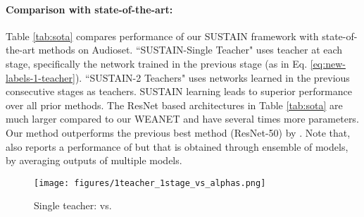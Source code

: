 \documentclass{article}
\begin{document}
\paragraph{Comparison with state-of-the-art:}
\begin{table}[t!]
  \centering
    \caption{Comparison with state-of-the-art methods on Audioset}
  \label{tab:sota}\end{table}

Table \ref{tab:sota} compares performance of our SUSTAIN framework with state-of-the-art methods on Audioset. 
``SUSTAIN-Single Teacher" uses  teacher at each stage, specifically the network trained in the previous stage (as in Eq. \ref{eq:new-labels-1-teacher}). 
``SUSTAIN-2 Teachers" uses  networks learned in the previous  consecutive stages as teachers.
SUSTAIN learning leads to superior performance over all prior methods. 
The ResNet based architectures in Table \ref{tab:sota} are much 
larger compared to our WEANET and have several times more parameters. 
Our method outperforms the previous best method (ResNet-50) by . Note that, \cite{ford2019deep} also reports a performance of  but that is obtained through ensemble of models, by averaging outputs of multiple models.  


\begin{figure}[t] 
\centering
 \texttt{[image: figures/1teacher\_1stage\_vs\_alphas.png]}
 \caption{\label{fig:vs_alphas} Single teacher:  vs. }
\end{figure}
\end{document}
